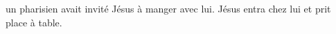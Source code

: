 \encetemps un pharisien avait invité Jésus à manger avec lui.
Jésus entra chez lui et prit place à table.
